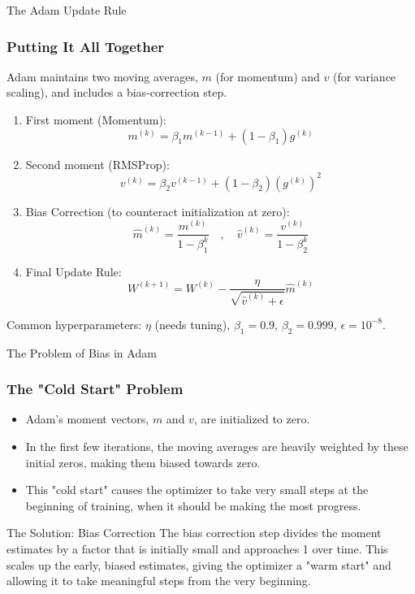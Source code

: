 \begin{frame}{The Adam Update Rule}
    \frametitle{Putting It All Together}
    Adam maintains two moving averages, $m$ (for momentum) and $v$ (for variance scaling), and includes a bias-correction step.
    \begin{enumerate}
        \item First moment (Momentum):
            $$ m^{(k)} = \beta_1 m^{(k-1)} + (1-\beta_1) g^{(k)} $$
        \item Second moment (RMSProp):
            $$ v^{(k)} = \beta_2 v^{(k-1)} + (1-\beta_2) (g^{(k)})^2 $$
        \item Bias Correction (to counteract initialization at zero):
            $$ \hat{m}^{(k)} = \frac{m^{(k)}}{1 - \beta_1^k} \quad , \quad \hat{v}^{(k)} = \frac{v^{(k)}}{1 - \beta_2^k} $$
        \item Final Update Rule:
            $$ W^{(k+1)} = W^{(k)} - \frac{\eta}{\sqrt{\hat{v}^{(k)} + \epsilon}} \hat{m}^{(k)} $$
    \end{enumerate}
    \footnotesize{Common hyperparameters: $\eta$ (needs tuning), $\beta_1=0.9$, $\beta_2=0.999$, $\epsilon=10^{-8}$.}
\end{frame}

\begin{frame}{The Problem of Bias in Adam}
    \frametitle{The "Cold Start" Problem}
    \begin{itemize}
        \item Adam's moment vectors, $m$ and $v$, are initialized to zero.
        \item In the first few iterations, the moving averages are heavily weighted by these initial zeros, making them biased towards zero.
        \item This "cold start" causes the optimizer to take very small steps at the beginning of training, when it should be making the most progress.
    \end{itemize}
    \begin{alertblock}{The Solution: Bias Correction}
        The bias correction step divides the moment estimates by a factor that is initially small and approaches 1 over time. This scales up the early, biased estimates, giving the optimizer a "warm start" and allowing it to take meaningful steps from the very beginning.
    \end{alertblock}
\end{frame}

